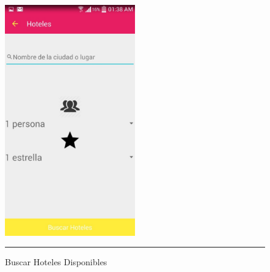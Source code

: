 \begin{figure}[h]
	\centering
		\includegraphics[width=0.5\textwidth]{Figuras/hoteles.jpg}
		\rule{30em}{0.5pt}
	\caption[Buscar Hoteles Disponibles]{Buscar Hoteles Disponibles}
	\label{fig:buscarHoteles}
\end{figure}
\clearpage

